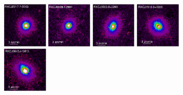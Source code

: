 \documentclass[oldversion]{aa}
\begin{document}
\begin{figure}[]

\includegraphics[scale=1.,angle=0,keepaspectratio,width=0.195\textwidth]{0944fa2a.ps}
\hfill
\includegraphics[scale=1.,angle=0,keepaspectratio,width=0.195\textwidth]{0944fa2b.ps}
\hfill
\includegraphics[scale=1.,angle=0,keepaspectratio,width=0.195\textwidth]{0944fa2c.ps}
\hfill
\includegraphics[scale=1.,angle=0,keepaspectratio,width=0.195\textwidth]{0944fa2d.ps}
\hfill
\includegraphics[scale=1.,angle=0,keepaspectratio,width=0.195\textwidth]{0944fa2e.ps}



\end{figure}
\end{document}
